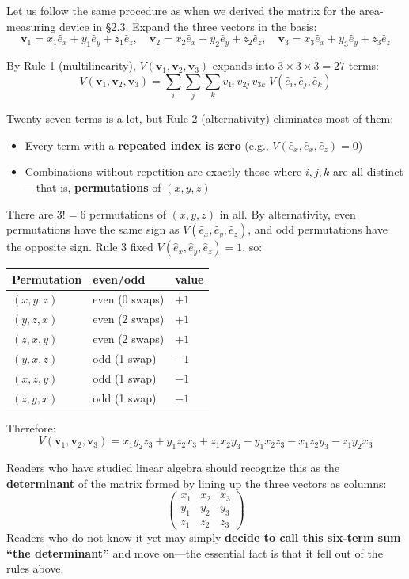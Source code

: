 \documentclass[a4paper,12pt,openany]{book}
\begin{document}
Let us follow the same procedure as when we derived the matrix for the
area-measuring device in §2.3. Expand the three vectors in the basis:
\[\mathbf{v}_1 = x_1 \hat{e}_x + y_1 \hat{e}_y + z_1 \hat{e}_z, \quad \mathbf{v}_2 = x_2 \hat{e}_x + y_2 \hat{e}_y + z_2 \hat{e}_z, \quad \mathbf{v}_3 = x_3 \hat{e}_x + y_3 \hat{e}_y + z_3 \hat{e}_z\]

By Rule 1 (multilinearity),
\(V(\mathbf{v}_1, \mathbf{v}_2, \mathbf{v}_3)\) expands into
\(3 \times 3 \times 3 = 27\) terms:
\[V(\mathbf{v}_1, \mathbf{v}_2, \mathbf{v}_3) = \sum_i\sum_j\sum_k v_{1i}\,v_{2j}\,v_{3k}\; V(\hat{e}_i, \hat{e}_j, \hat{e}_k)\]

Twenty-seven terms is a lot, but Rule 2 (alternativity) eliminates most
of them:

\begin{itemize}
\item
  Every term with a \textbf{repeated index is zero} (e.g.,
  \(V(\hat{e}_x, \hat{e}_x, \hat{e}_z) = 0\))
\item
  Combinations without repetition are exactly those where \(i, j, k\)
  are all distinct—that is, \textbf{permutations} of \((x,y,z)\)
\end{itemize}

There are \(3! = 6\) permutations of \((x, y, z)\) in all. By
alternativity, even permutations have the same sign as
\(V(\hat{e}_x, \hat{e}_y, \hat{e}_z)\), and odd permutations have the
opposite sign. Rule 3 fixed \(V(\hat{e}_x, \hat{e}_y, \hat{e}_z) = 1\),
so:

\begin{longtable}[]{@{}lll@{}}
\toprule\noalign{}
Permutation & even/odd & value \\
\midrule\noalign{}
\endhead
\bottomrule\noalign{}
\endlastfoot
\((x,y,z)\) & even (0 swaps) & \(+1\) \\
\((y,z,x)\) & even (2 swaps) & \(+1\) \\
\((z,x,y)\) & even (2 swaps) & \(+1\) \\
\((y,x,z)\) & odd (1 swap) & \(-1\) \\
\((x,z,y)\) & odd (1 swap) & \(-1\) \\
\((z,y,x)\) & odd (1 swap) & \(-1\) \\
\end{longtable}

Therefore:
\[V(\mathbf{v}_1, \mathbf{v}_2, \mathbf{v}_3) = x_1 y_2 z_3 + y_1 z_2 x_3 + z_1 x_2 y_3 - y_1 x_2 z_3 - x_1 z_2 y_3 - z_1 y_2 x_3\]

Readers who have studied linear algebra should recognize this as the
\textbf{determinant} of the matrix formed by lining up the three vectors
as columns:
\[\begin{pmatrix} x_1 & x_2 & x_3 \\ y_1 & y_2 & y_3 \\ z_1 & z_2 & z_3 \end{pmatrix}\]
Readers who do not know it yet may simply
\textbf{decide to call this six-term sum “the determinant”} and move
on—the essential fact is that it fell out of the rules above.
\end{document}
